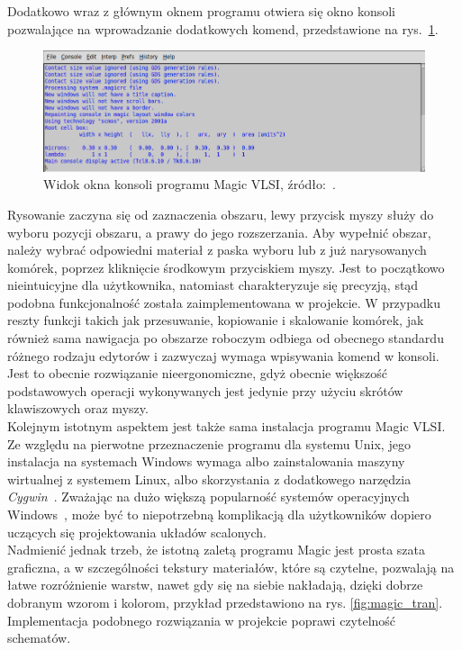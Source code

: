 \indent Dodatkowo wraz z głównym oknem programu otwiera się okno konsoli pozwalające na wprowadzanie dodatkowych komend,
przedstawione na rys.~\ref{fig:magic_konsola}.

\begin{figure}[h]
    \centering
    \includegraphics[width=.9\textwidth]{chapters/chapter2/img/magic_okno_konsola}
    \caption[Widok okna konsoli programu Magic VLSI.]{Widok okna konsoli programu Magic VLSI, źródło:~\cite{MAGIC_site}.}
    \label{fig:magic_konsola}
\end{figure}

\indent Rysowanie zaczyna się od zaznaczenia obszaru, lewy przycisk myszy służy do wyboru pozycji obszaru,
a prawy do jego rozszerzania.
Aby wypełnić obszar, należy wybrać odpowiedni materiał z paska wyboru
lub z już narysowanych komórek,
poprzez kliknięcie środkowym przyciskiem myszy.
Jest to początkowo nieintuicyjne dla użytkownika,
natomiast charakteryzuje się precyzją, stąd podobna funkcjonalność została zaimplementowana w projekcie.
W przypadku reszty funkcji takich jak przesuwanie, kopiowanie i skalowanie komórek,
jak również sama nawigacja po obszarze roboczym odbiega od obecnego standardu różnego rodzaju edytorów
i zazwyczaj wymaga wpisywania komend w konsoli.
Jest to obecnie rozwiązanie nieergonomiczne, gdyż obecnie większość podstawowych operacji wykonywanych jest
jedynie przy użyciu skrótów klawiszowych oraz myszy.\\
\indent Kolejnym istotnym aspektem jest także sama instalacja programu Magic VLSI\@.
Ze względu na pierwotne przeznaczenie programu dla systemu Unix,
jego instalacja na systemach Windows wymaga albo zainstalowania maszyny wirtualnej z systemem Linux,
albo skorzystania z dodatkowego narzędzia \textit{Cygwin}~\cite{MAGIC_site,cygwin}.
Zważając na dużo większą popularność systemów operacyjnych Windows~\cite{os_stats},
może być to niepotrzebną komplikacją dla użytkowników dopiero uczących się projektowania układów scalonych.\\
\indent Nadmienić jednak trzeb, że istotną zaletą programu Magic jest prosta szata graficzna,
a w szczególności tekstury materiałów, które są czytelne, pozwalają na łatwe rozróżnienie warstw,
nawet gdy się na siebie nakładają, dzięki dobrze dobranym wzorom i kolorom,
przykład przedstawiono na rys. \ref{fig:magic_tran}.
Implementacja podobnego rozwiązania w projekcie poprawi czytelność schematów.

